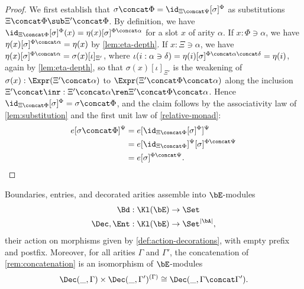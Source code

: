\begin{proof}
    We first establish that $\sigma \concat \Phi = \id_{\Xi \concat \Psi}[\sigma]^{\Phi}$ as substitutions $\Xi \concat \Phi \sub \Xi' \concat \Phi$.
    By definition, we have $\id_{\Xi \concat \Phi}[\sigma]^\Phi(x) = \eta(x)[\sigma]^{\Phi \concat \alpha}$ for a slot $x$ of arity $\alpha$. If $x : \Phi \ni \alpha$, we have $\eta(x)[\sigma]^{\Phi \concat \alpha} = \eta(x)$ by \cref{lem:eta-depth}.
    If $x : \Xi \ni \alpha$, we have $\eta(x)[\sigma]^{\Phi \concat \alpha} = \sigma(x)[\iota]_{\Xi'}$, where $\iota(i : \alpha \ni \delta) = \eta(i)[\sigma]^{\Phi \concat \alpha \concat \delta} = \eta(i)$, again by \cref{lem:eta-depth}, so that $\sigma(x)[\iota]_{\Xi'}$ is the weakening of $\sigma(x) : \Expr(\Xi' \concat \alpha)$ to $\Expr(\Xi' \concat \Phi \concat \alpha)$ along the inclusion $\Xi' \concat \inr : \Xi' \concat \alpha \ren \Xi' \concat \Phi \concat \alpha$. Hence $\id_{\Xi \concat \Phi}[\sigma]^\Phi = \sigma \concat \Phi$, and the claim follows by the associativity law of \cref{lem:substitution} and the first unit law of \cref{relative-monad}:
    \begin{align*}
        e[\sigma\concat\Phi]^{\Psi} &= e[\id_{\Xi\concat\Phi}[\sigma]^{\Phi}]^{\Psi}\\
        &= e[\id_{\Xi\concat\Phi}]^{\Psi}[\sigma]^{\Phi\concat\Psi}\\
        &= e[\sigma]^{\Phi\concat\Psi}.\qedhere
    \end{align*}
\end{proof}

\begin{proposition}\label{prop:decoration-modules}
    Boundaries, entries, and decorated arities assemble into $\bE$-modules
    \begin{align*}
    \Bd : \Kl(\bE) &\to \Set\\
    \Dec, \Ent : \Kl(\bE) &\to \Set^{\left|\bA\right|},
    \end{align*}
    their action on morphisms given by \cref{def:action-decorations}, with empty prefix and postfix. 
    Moreover, for all arities $\Gamma$ and $\Gamma'$, the concatenation of \cref{rem:concatenation} is an isomorphism of $\bE$-modules
    \[
    \Dec(\_, \Gamma) \times \Dec(\_, \Gamma')^{(\Gamma)} \cong \Dec(\_, \Gamma \concat \Gamma').
    \]
\end{proposition}

